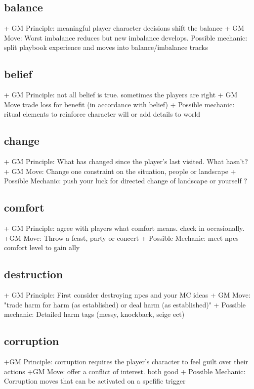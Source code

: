 \documentclass{tufte-handout}
\begin{document}
\subsection{balance}
+ GM Principle: meaningful player character decisions shift the balance
+ GM Move: Worst imbalance reduces but new imbalance develops.	
Possible mechanic: split playbook experience and moves into balance/imbalance tracks

\subsection{belief}
+ GM Principle: not all belief is true. sometimes the players are right
+ GM Move trade loss for benefit (in accordance with belief)
+ Possible mechanic: ritual elements to reinforce character will or add details to world

\subsection{change}
+ GM Principle: What has changed since the player's last visited. What hasn't?	
+ GM Move: Change one constraint on the situation, people or landscape
+ Possible Mechanic: push your luck for directed change of landscape or yourself ?

\subsection{comfort}
+ GM Principle: agree with players what comfort means. check in occasionally.
+GM Move: Throw a feast, party or concert
+ Possible Mechanic: meet npcs comfort level to gain ally

\subsection{destruction }
+ GM Principle: First consider destroying npcs and your MC ideas	
+ GM Move: "trade harm for harm (as established) or deal harm (as established)"	
+ Possible mechanic: Detailed harm tags (messy, knockback, seige ect)


\subsection{corruption}
+GM Principle: corruption requires the player's character to feel guilt over their actions	
+GM Move:  offer a conflict of interest. both good	
+ Possible Mechanic: Corruption moves that can be activated on a spefific trigger
\end{document}
